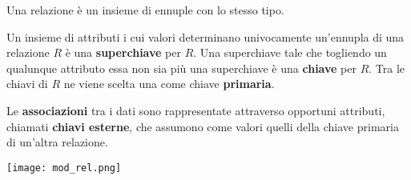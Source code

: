 \begin{definition}[Relazione]
	Una relazione è un insieme di ennuple con lo stesso tipo.
\end{definition}

\begin{definition}
	Un insieme di attributi i cui valori determinano univocamente un’ennupla di una	relazione $R$ è una \textbf{superchiave} per $R$. Una superchiave tale che togliendo un qualunque attributo essa non sia più una	superchiave è una \textbf{chiave} per $R$. Tra le chiavi di $R$ ne viene scelta una come chiave \textbf{primaria}.
\end{definition}
Le \textbf{associazioni} tra i dati sono rappresentate attraverso opportuni attributi, chiamati \textbf{chiavi esterne}, che assumono come valori quelli della chiave primaria di un’altra relazione. 

\begin{center}
	\texttt{[image: mod\_rel.png]}
\end{center}